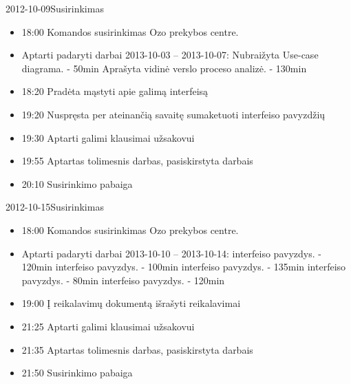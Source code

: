 \begin{loggentry}{2012-10-09}{Susirinkimas}

	\begin{itemize}
		\item 18:00 Komandos susirinkimas Ozo prekybos centre.
		\item Aptarti padaryti darbai 2013-10-03 – 2013-10-07:
			\subitem Nubraižyta Use-case diagrama. - 50min
			\subitem Aprašyta vidinė verslo proceso analizė. - 130min
		\item 18:20 Pradėta mąstyti apie galimą interfeisą
		\item 19:20 Nuspręsta per ateinančią savaitę sumaketuoti interfeiso pavyzdžių
		\item 19:30 Aptarti galimi klausimai užsakovui
		\item 19:55 Aptartas tolimesnis darbas, pasiskirstyta darbais
		\item 20:10 Susirinkimo pabaiga
	\end{itemize}
	
\end{loggentry}

\begin{loggentry}{2012-10-15}{Susirinkimas}

	\begin{itemize}
		\item 18:00 Komandos susirinkimas Ozo prekybos centre.
		\item Aptarti padaryti darbai 2013-10-10 – 2013-10-14:
			 interfeiso pavyzdys. - 120min
			 interfeiso pavyzdys. - 100min
			 interfeiso pavyzdys. - 135min
			 interfeiso pavyzdys. - 80min
			 interfeiso pavyzdys. - 120min
		\item 19:00 Į reikalavimų dokumentą išrašyti reikalavimai
		\item 21:25 Aptarti galimi klausimai užsakovui
		\item 21:35 Aptartas tolimesnis darbas, pasiskirstyta darbais
		\item 21:50 Susirinkimo pabaiga
	\end{itemize}
	
\end{loggentry}
